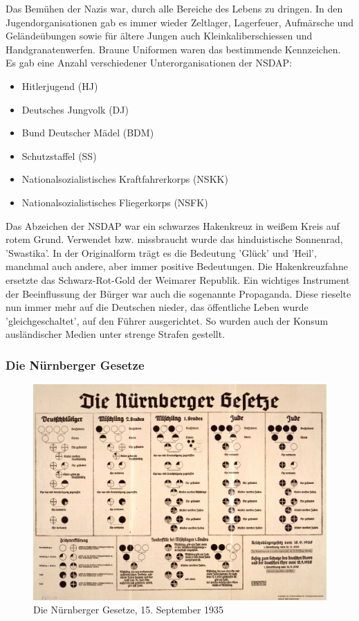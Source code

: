 \documentclass[letterpaper, 12pt]{article}
\let\tempsubsubsection\subsubsection
\renewcommand\subsubsection[1]{\vspace{0cm}\tempsubsubsection{#1}\vspace{0cm}}
\begin{document}

Das Bemühen der Nazis war, durch alle Bereiche des Lebens zu dringen. In den Jugendorganisationen gab es immer wieder Zeltlager, Lagerfeuer, Aufmärsche und Geländeübungen sowie für ältere Jungen auch Kleinkaliberschiessen und Handgranatenwerfen. Braune Uniformen waren das bestimmende Kennzeichen. Es gab eine Anzahl verschiedener Unterorganisationen der NSDAP:

\begin{itemize}
	\item Hitlerjugend (HJ)
	\item Deutsches Jungvolk (DJ)
	\item Bund Deutscher Mädel (BDM)
	\item Schutzstaffel (SS)
	\item Nationalsozialistisches Kraftfahrerkorps (NSKK)
	\item Nationalsozialistisches Fliegerkorps (NSFK)
\end{itemize}

Das Abzeichen der NSDAP war ein schwarzes Hakenkreuz in weißem Kreis auf rotem Grund. Verwendet bzw. missbraucht wurde das hinduistische Sonnenrad, 'Swastika'. In der Originalform trägt es die Bedeutung 'Glück' und 'Heil', manchmal auch andere, aber immer positive Bedeutungen. Die Hakenkreuzfahne ersetzte das Schwarz-Rot-Gold der Weimarer Republik. Ein wichtiges Instrument der Beeinflussung der Bürger war auch die sogenannte Propaganda. Diese rieselte nun immer mehr auf die Deutschen nieder, das öffentliche Leben wurde 'gleichgeschaltet', auf den Führer ausgerichtet. So wurden auch der Konsum ausländischer Medien unter strenge Strafen gestellt.

\subsubsection{Die Nürnberger Gesetze}

\begin{figure}[h]
	\includegraphics[width=1\textwidth]{images/gesetze.jpg}
	\caption{Die Nürnberger Gesetze, 15. September 1935}
\end{figure}
\end{document}
